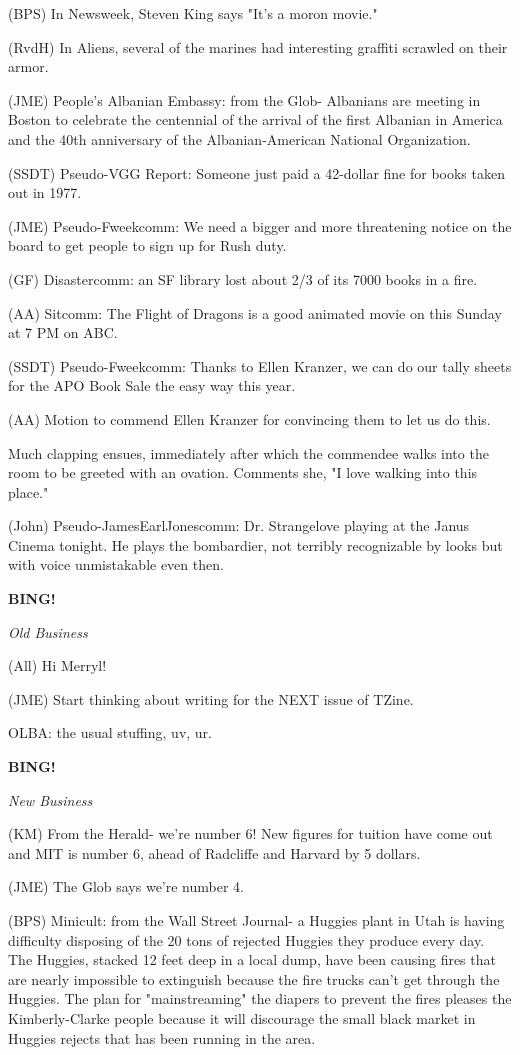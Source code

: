 \documentclass[12pt]{article}
\newcommand{\bing}{{\bf BING!} }
\newcommand{\goto}[1]{\bing \vskip 12pt \centerline{{\em{#1}}}}
\begin{document}
(BPS) In Newsweek, Steven King says "It's a moron movie."

(RvdH) In Aliens, several of the marines had interesting graffiti scrawled on their armor.

(JME) People's Albanian Embassy: from the Glob- Albanians are meeting in Boston to celebrate the centennial of the arrival of the first Albanian in America and the 40th anniversary of the Albanian-American National Organization.

(SSDT) Pseudo-VGG Report: Someone just paid a 42-dollar fine for books taken out in 1977.

(JME) Pseudo-Fweekcomm: We need a bigger and more threatening notice on the board to get people to sign up for Rush duty.

(GF) Disastercomm: an SF library lost about 2/3 of its 7000 books in a fire.

(AA) Sitcomm: The Flight of Dragons is a good animated movie on this Sunday at 7 PM on ABC.

(SSDT) Pseudo-Fweekcomm: Thanks to Ellen Kranzer, we can do our tally sheets for the APO Book Sale the easy way this year.

(AA) Motion to commend Ellen Kranzer for convincing them to let us do this.

Much clapping ensues, immediately after which the commendee walks into the room to be greeted with an ovation. Comments she, "I love walking into this place."

(John) Pseudo-JamesEarlJonescomm: Dr. Strangelove playing at the Janus Cinema tonight. He plays the bombardier, not terribly recognizable by looks but with voice unmistakable even then.

\goto{Old Business}

(All) Hi Merryl!

(JME) Start thinking about writing for the NEXT issue of TZine.

OLBA: the usual stuffing, uv, ur.

\goto{New Business}

(KM) From the Herald- we're number 6! New figures for tuition have come out and MIT is number 6, ahead of Radcliffe and Harvard by 5 dollars.

(JME) The Glob says we're number 4.

(BPS) Minicult: from the Wall Street Journal- a Huggies plant in Utah is having difficulty disposing of the 20 tons of rejected Huggies they produce every day. The Huggies, stacked 12 feet deep in a local dump, have been causing fires that are nearly impossible to extinguish because the fire trucks can't get through the Huggies. The plan for "mainstreaming" the diapers to prevent the fires pleases the Kimberly-Clarke people because it will discourage the small black market in Huggies rejects that has been running in the area.
\end{document}
